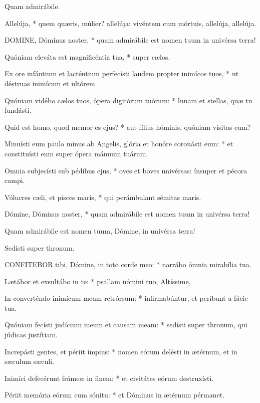  Quam admirábile.


 Allelúja, * quem quæris, múlier? allelúja: vivéntem cum mórtuis, allelúja, allelúja.


\lettrine[lines=2]{D}{OMINE}, Dóminus noster, * quam admirábile est nomen tuum in univérsa terra!

Quóniam eleváta est magnificéntia tua, * super cælos.

Ex ore infántium et lacténtium perfecísti laudem propter inimícos tuos, * ut déstruas inimícum et ultórem.

Quóniam vidébo cælos tuos, ópera digitórum tuórum: * lunam et stellas, quæ tu fundásti.

Quid est homo, quod memor es ejus? * aut fílius hóminis, quóniam vísitas eum?

Minuísti eum paulo minus ab Angelis, glória et honóre coronásti eum: * et constituísti eum super ópera mánuum tuárum.

Omnia subjecísti sub pédibus ejus, * oves et boves univérsas: ínsuper et pécora campi.

Vólucres cæli, et pisces maris, * qui perámbulant sémitas maris.

Dómine, Dóminus noster, * quam admirábile est nomen tuum in univérsa terra!

 Quam admirábile est nomen tuum, Dómine, in univérsa terra!

 Sedísti super thronum.


\lettrine[lines=2]{C}{ONFITEBOR} tibi, Dómine, in toto corde meo: * narrábo ómnia mirabília tua.

Lætábor et exsultábo in te: * psallam nómini tuo, Altíssime,

In converténdo inimícum meum retrórsum: * infirmabúntur, et períbunt a fácie tua.

Quóniam fecísti judícium meum et causam meam: * sedísti super thronum, qui júdicas justítiam.

Increpásti gentes, et périit ímpius: * nomen eórum delésti in ætérnum, et in sæculum sæculi.

Inimíci defecérunt frámeæ in finem: * et civitátes eórum destruxísti.

Périit memória eórum cum sónitu: * et Dóminus in ætérnum pérmanet.

